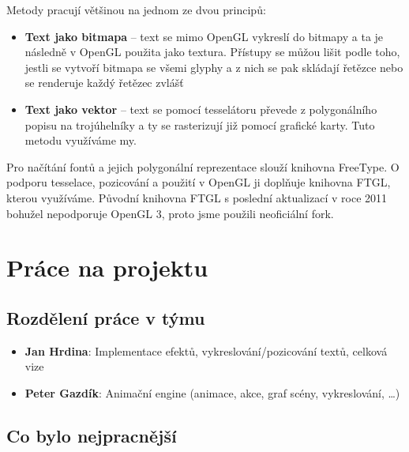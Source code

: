 \documentclass[12pt,a4paper,titlepage,final]{report}
\newcommand\AuthorA{Jan Hrdina}
\newcommand\AuthorB{Peter Gazdík}
\begin{document}
Metody pracují většinou na jednom ze dvou principů:

\begin{itemize}
\item \textbf{Text jako bitmapa} -- text se mimo OpenGL vykreslí do bitmapy a ta je následně v OpenGL použita jako textura. Přístupy se můžou lišit podle toho, jestli se vytvoří bitmapa se všemi glyphy a z nich se pak skládají řetězce nebo se renderuje každý řetězec zvlášť
\item \textbf{Text jako vektor} -- text se pomocí tesselátoru převede z polygonálního popisu na trojúhelníky a ty se rasterizují již pomocí grafické karty. Tuto metodu využíváme my.
\end{itemize}

Pro načítání fontů a jejich polygonální reprezentace slouží knihovna FreeType. O podporu tesselace, pozicování a použití v OpenGL ji doplňuje knihovna FTGL, kterou využíváme. Původní knihovna FTGL s poslední aktualizací v roce 2011 bohužel nepodporuje OpenGL 3, proto jsme použili neoficiální fork.




\chapter{Práce na projektu}

\section{Rozdělení práce v týmu}

\begin{itemize}
\item \textbf{\AuthorA}: Implementace efektů, vykreslování/pozicování textů, celková vize
\item \textbf{\AuthorB}: Animační engine (animace, akce, graf scény, vykreslování, \dots)
\end{itemize}

\section{Co bylo nejpracnější}
\end{document}
